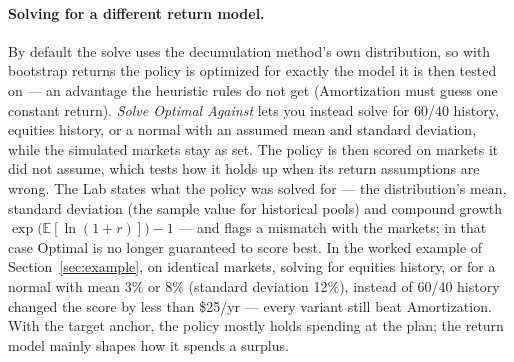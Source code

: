 \documentclass[11pt,letterpaper]{article}
\begin{document}
\paragraph{Solving for a different return model.} By default the solve uses the decumulation method's own distribution, so with bootstrap returns the policy is optimized for exactly the model it is then tested on --- an advantage the heuristic rules do not get (Amortization must guess one constant return). \emph{Solve Optimal Against} lets you instead solve for 60/40 history, equities history, or a normal with an assumed mean and standard deviation, while the simulated markets stay as set. The policy is then scored on markets it did not assume, which tests how it holds up when its return assumptions are wrong. The Lab states what the policy was solved for --- the distribution's mean, standard deviation (the sample value for historical pools) and compound growth $\exp\!\big(\mathbb{E}[\ln(1+r)]\big)-1$ --- and flags a mismatch with the markets; in that case Optimal is no longer guaranteed to score best. In the worked example of Section~\ref{sec:example}, on identical markets, solving for equities history, or for a normal with mean 3\% or 8\% (standard deviation 12\%), instead of 60/40 history changed the score by less than \$25/yr --- every variant still beat Amortization. With the target anchor, the policy mostly holds spending at the plan; the return model mainly shapes how it spends a surplus.
\end{document}
